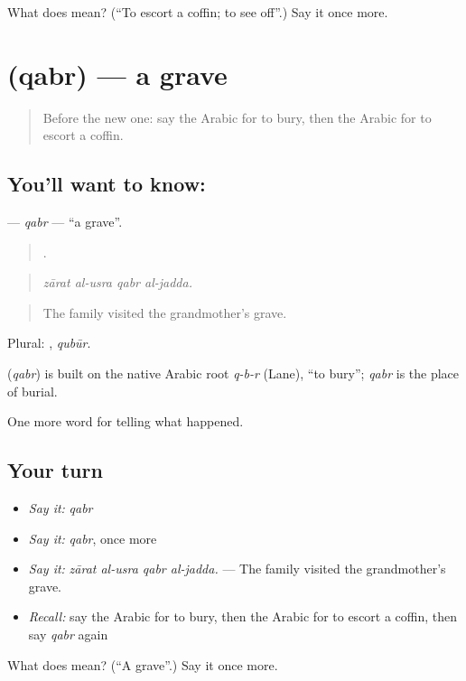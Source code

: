 \begin{tcolorbox}[breakable,colback=teal!4,colframe=teal!35!black,title={Before you move on}]
What does  mean? (\textquotedblleft{}To escort a coffin; to see off\textquotedblright{}.) Say it once more.
\end{tcolorbox}
\section[\texorpdfstring{\ar{قبر} (qabr)}{قبر (qabr)}]{ (qabr) — a grave}

\label{lesson:AR-C314-qabr}



\begin{quote}
Before the new one: say the Arabic for to bury, then the Arabic for to escort a coffin.
\end{quote}

\subsection*{You'll want to know: }
\textbf{} — \emph{qabr} — \textquotedblleft{}a grave\textquotedblright{}.

\begin{quote}
   .
\end{quote}

\begin{quote}
\emph{zārat al-usra qabr al-jadda.}
\end{quote}

\begin{quote}
The family visited the grandmother’s grave.
\end{quote}

Plural: , \emph{qubūr}.

\begin{cousinweb}
\textbf{} (\emph{qabr}) is built on the native Arabic root \emph{q-b-r} (Lane), \textquotedblleft{}to bury\textquotedblright{}; \emph{qabr} is the place of burial.
\end{cousinweb}

\begin{grammarlens}[title={What you've built}]
One more word for telling what happened.
\end{grammarlens}

\subsection*{Your turn}
\begin{itemize}
\raggedright
  \item \emph{Say it:} \emph{qabr}
  \item \emph{Say it:} \emph{qabr}, once more
  \item \emph{Say it:} \emph{zārat al-usra qabr al-jadda.} — The family visited the grandmother’s grave.
  \item \emph{Recall:} say the Arabic for to bury, then the Arabic for to escort a coffin, then say \emph{qabr} again
\end{itemize}

\begin{tcolorbox}[breakable,colback=teal!4,colframe=teal!35!black,title={Before you move on}]
What does  mean? (\textquotedblleft{}A grave\textquotedblright{}.) Say it once more.
\end{tcolorbox}
